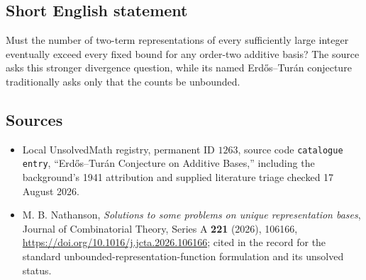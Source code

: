 \documentclass[11pt]{article}
\begin{document}
\subsection{Short English statement}
Must the number of two-term representations of every sufficiently large integer eventually exceed every fixed bound for any order-two additive basis? The source asks this stronger divergence question, while its named Erd\H{o}s--Tur\'an conjecture traditionally asks only that the counts be unbounded.
\subsection{Sources}
\begin{itemize}
\item Local UnsolvedMath registry, permanent ID $1263$, source code \texttt{catalogue entry}, ``Erd\H{o}s--Tur\'an Conjecture on Additive Bases,'' including the background's 1941 attribution and supplied literature triage checked 17 August 2026.
\item M. B. Nathanson, \emph{Solutions to some problems on unique representation bases}, Journal of Combinatorial Theory, Series A \textbf{221} (2026), 106166, \url{https://doi.org/10.1016/j.jcta.2026.106166}; cited in the record for the standard unbounded-representation-function formulation and its unsolved status.
\end{itemize}
\end{document}
